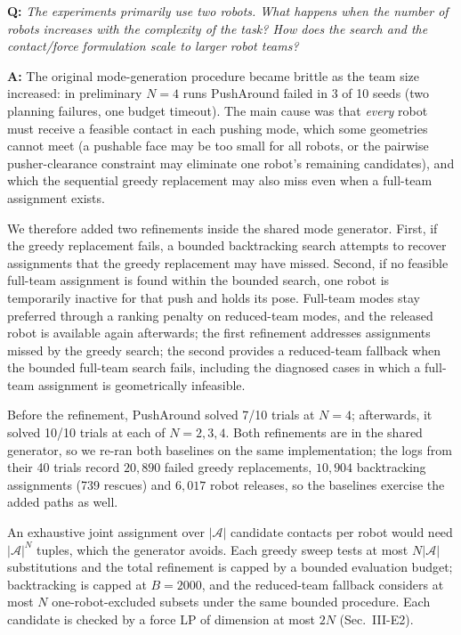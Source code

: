 \documentclass[11pt]{article}
\begin{document}
\begin{shaded*}
\noindent \textbf{Q:}
{\itshape
The experiments primarily use two robots. What happens when the
number of robots increases with the complexity of the task? How does
the search and the contact/force formulation scale to larger robot
teams?
}
\end{shaded*}



\noindent \textbf{A:}
The original mode-generation procedure became brittle as the team size increased: in preliminary
$N{=}4$ runs PushAround failed in 3 of 10 seeds (two planning failures, one budget timeout). The main
cause was that \emph{every} robot must receive a feasible contact in each pushing mode, which some
geometries cannot meet (a pushable face may be too small for all robots, or the pairwise
pusher-clearance constraint may eliminate one robot's remaining candidates), and which the
sequential greedy replacement may also miss even when a full-team assignment exists.

We therefore added two refinements inside the shared mode generator. First, if the greedy
replacement fails, a bounded backtracking search attempts to recover assignments that the greedy
replacement may have missed.
Second, if no feasible full-team assignment is found within the bounded search, one robot is
temporarily inactive for that push and holds its pose. Full-team modes stay preferred through a ranking penalty on reduced-team modes, and the
released robot is available again afterwards; the first refinement addresses assignments missed by the greedy search; the second provides a
reduced-team fallback when the bounded full-team search fails, including the diagnosed cases in which
a full-team assignment is geometrically infeasible.

Before the refinement, PushAround solved 7/10 trials at $N{=}4$; afterwards, it solved 10/10
trials at each of $N{=}2,3,4$.
Both refinements are in the shared generator, so we re-ran both baselines on the same implementation;
the logs from their 40 trials record $20{,}890$ failed greedy replacements, $10{,}904$ backtracking assignments
(739 rescues) and $6{,}017$ robot releases, so the baselines exercise the added paths as well.

An exhaustive joint assignment over $|\mathcal A|$ candidate contacts per robot would need
$|\mathcal A|^{N}$ tuples, which the generator avoids. Each greedy sweep tests at most
$N|\mathcal A|$ substitutions and the total refinement is capped by a bounded evaluation budget;
backtracking is capped at $B{=}2000$, and the reduced-team fallback considers at most $N$
one-robot-excluded subsets under the same bounded procedure. Each candidate is checked by a force LP
of dimension at most $2N$ (Sec.~III-E2).
\end{document}
